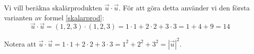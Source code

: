 \documentclass[../../main.tex]{subfiles}
\begin{document}
\begin{solution}{3}
Vi vill beräkna skalärprodukten $\Vec{u}\cdot\Vec{u}$. För att göra detta använder vi den första varianten av formel \ref{skalarprod}:
\[
\Vec{u}\cdot\Vec{u} = (1, 2, 3) \cdot (1, 2, 3) = 1\cdot1 + 2\cdot2 + 3\cdot3 = 1 + 4 + 9 = 14
\]

Notera att \(\Vec{u}\cdot\Vec{u} = 1\cdot1 + 2\cdot2 + 3\cdot3 = 1^2 + 2^2 + 3^2 = |\vec{u}|^2\). 


\end{solution}
\end{document}
